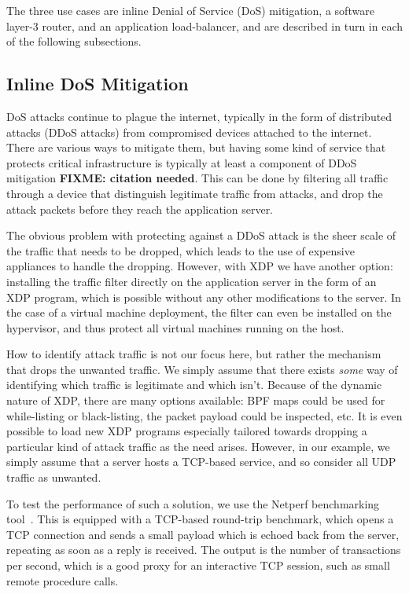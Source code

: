 \documentclass[10pt,sigconf]{acmart}
\begin{document}
The three use cases are inline Denial of Service (DoS) mitigation, a software
layer-3 router, and an application load-balancer, and are described in turn in
each of the following subsections.

\subsection{Inline DoS Mitigation}
\label{sec:dos-usecase}
DoS attacks continue to plague the internet, typically in the form of
distributed attacks (DDoS attacks) from compromised devices attached to the
internet. There are various ways to mitigate them, but having some kind of
service that protects critical infrastructure is typically at least a component
of DDoS mitigation \textbf{FIXME: citation needed}. This can be done by
filtering all traffic through a device that distinguish legitimate traffic from
attacks, and drop the attack packets before they reach the application server.

The obvious problem with protecting against a DDoS attack is the sheer scale of
the traffic that needs to be dropped, which leads to the use of expensive
appliances to handle the dropping. However, with XDP we have another option:
installing the traffic filter directly on the application server in the form of
an XDP program, which is possible without any other modifications to the server.
In the case of a virtual machine deployment, the filter can even be installed on
the hypervisor, and thus protect all virtual machines running on the host.

How to identify attack traffic is not our focus here, but rather the mechanism
that drops the unwanted traffic. We simply assume that there exists \emph{some}
way of identifying which traffic is legitimate and which isn't. Because of the
dynamic nature of XDP, there are many options available: BPF maps could be used
for while-listing or black-listing, the packet payload could be inspected, etc.
It is even possible to load new XDP programs especially tailored towards
dropping a particular kind of attack traffic as the need arises. However, in our
example, we simply assume that a server hosts a TCP-based service, and so
consider all UDP traffic as unwanted.

To test the performance of such a solution, we use the Netperf benchmarking
tool~\cite{netperf}. This is equipped with a TCP-based round-trip benchmark,
which opens a TCP connection and sends a small payload which is echoed back from
the server, repeating as soon as a reply is received. The output is the number
of transactions per second, which is a good proxy for an interactive TCP
session, such as small remote procedure calls.
\end{document}
